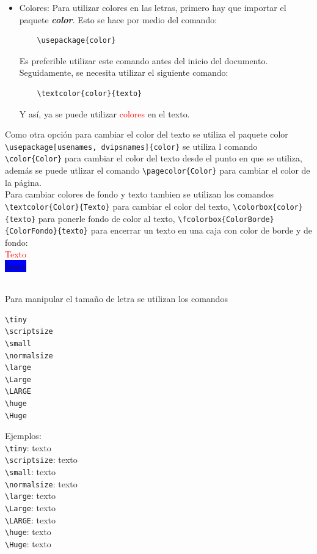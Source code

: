 \documentclass[10pt,journal,compsoc]{IEEEtran}
\begin{document}
\begin{itemize}
	\begin{lstlisting}
	\emph{\textbf{texto}}
	\end{lstlisting}
	Por ejemplo: el comando de arriba \emph{\textbf{quedar\'ia as\'i}}.
	\item Colores: Para utilizar colores en las letras, primero hay que importar el paquete \textit{\textbf{color}}. Esto se hace por medio del comando:
	\begin{lstlisting}
	\usepackage{color}
	\end{lstlisting}
	Es preferible utilizar este comando antes del inicio del documento.
	Seguidamente, se necesita utilizar el siguiente comando:
	\begin{lstlisting}
	\textcolor{color}{texto}
	\end{lstlisting}
	Y as\'i, ya se puede utilizar \textcolor{red}{colores} en el texto.
\end{itemize}
Como otra opci\'on para cambiar el color del texto se utiliza el paquete color \verb|\usepackage[usenames, dvipsnames]{color}| se utiliza l comando \verb|\color{Color}| para cambiar el color del texto desde el punto en que se utiliza, adem\'as se puede utlizar el comando \verb|\pagecolor{Color}| para cambiar el color de la p\'agina.\\
Para cambiar colores de fondo y texto tambien se utilizan los comandos \verb|\textcolor{Color}{Texto}| para cambiar el color del texto, \verb|\colorbox{color}{texto}| para ponerle fondo de color al texto, \verb|\fcolorbox{ColorBorde}{ColorFondo}{texto}| para encerrar un texto en una caja con color de borde y de fondo:\\
\textcolor{red}{Texto}\\\newline
\colorbox{blue}{Texto}\\\newline
{}\\\newline

Para manipular el tama\~no de letra se utilizan los comandos
\begin{lstlisting}
\tiny
\scriptsize
\small
\normalsize
\large
\Large
\LARGE
\huge
\Huge
\end{lstlisting}
Ejemplos:\\
\verb|\tiny|: \tiny texto\\\normalsize
\verb|\scriptsize|: \scriptsize texto\\\normalsize
\verb|\small|: \small texto\\\normalsize
\verb|\normalsize|: \normalsize texto\\\normalsize
\verb|\large|: \large texto\\\normalsize
\verb|\Large|: \Large texto\\\normalsize
\verb|\LARGE|: \LARGE texto\\\normalsize
\verb|\huge|: \huge texto\\\normalsize
\verb|\Huge|: \Huge texto\\\normalsize
\normalsize
\end{document}

